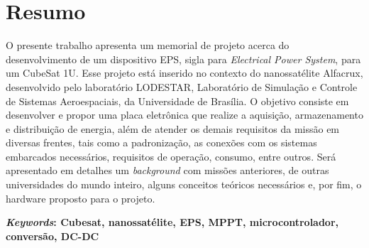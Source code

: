 \chapter*{Resumo}
O presente trabalho apresenta um memorial de projeto acerca do desenvolvimento de um dispositivo EPS, sigla para \textit{Electrical Power System}, para um CubeSat 1U. Esse projeto está inserido no contexto do nanossatélite Alfacrux, desenvolvido pelo laboratório LODESTAR, Laboratório de Simulação e Controle de Sistemas Aeroespaciais, da Universidade de Brasília. O objetivo consiste em desenvolver e propor uma placa eletrônica que realize a aquisição, armazenamento e distribuição de energia, além de atender os demais requisitos da missão em diversas frentes, tais como a padronização, as conexões com os sistemas embarcados necessários, requisitos de operação, consumo, entre outros. Será apresentado em detalhes um \textit{background} com missões anteriores, de outras universidades do mundo inteiro, alguns conceitos teóricos necessários e, por fim, o hardware proposto para o projeto.

\textbf{\textit{Keywords}: Cubesat, nanossatélite, EPS, MPPT, microcontrolador, conversão, DC-DC}